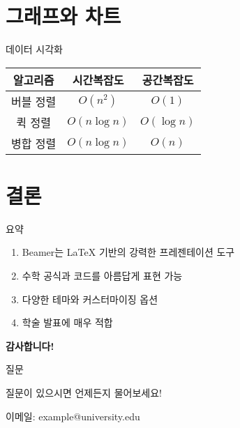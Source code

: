 \documentclass[aspectratio=169]{beamer}
\begin{document}
\section{그래프와 차트}

\begin{frame}{데이터 시각화}
    \begin{center}
        \begin{tabular}{|c|c|c|}
            \hline
            \textbf{알고리즘} & \textbf{시간복잡도} & \textbf{공간복잡도} \\
            \hline
            버블 정렬 & $O(n^2)$ & $O(1)$ \\
            퀵 정렬 & $O(n \log n)$ & $O(\log n)$ \\
            병합 정렬 & $O(n \log n)$ & $O(n)$ \\
            \hline
        \end{tabular}
    \end{center}
\end{frame}

\section{결론}

\begin{frame}{요약}
    \begin{enumerate}
        \item<1-> Beamer는 LaTeX 기반의 강력한 프레젠테이션 도구
        \item<2-> 수학 공식과 코드를 아름답게 표현 가능
        \item<3-> 다양한 테마와 커스터마이징 옵션
        \item<4-> 학술 발표에 매우 적합
    \end{enumerate}
    
    \pause
    
    \begin{center}
        \Large \textbf{감사합니다!}
    \end{center}
\end{frame}

\begin{frame}{질문}
    \begin{center}
        \Huge 질문이 있으시면 언제든지 물어보세요!
        
        \vspace{1cm}
        
        \large 이메일: example@university.edu
    \end{center}
\end{frame}
\end{document}
